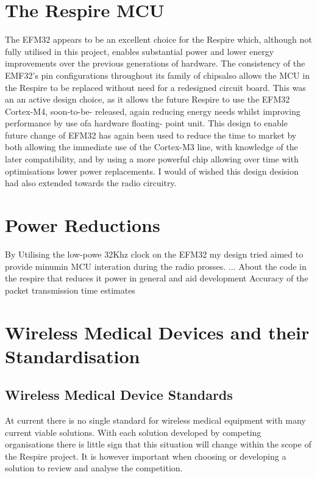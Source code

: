 \section{The Respire MCU}
The EFM32 appears to be an excellent choice for the Respire which, although not fully utilised in this
project, enables substantial power and lower energy improvements over the previous generations of
hardware. The consistency of the EMF32's pin configurations throughout its family of chipsalso
allows the MCU in the Respire to be replaced without need for a redesigned circuit board. This was
an an active design choice, as it allows the future Respire to use the EFM32 Cortex-M4, soon-to-be-
released, again reducing energy needs whilst improving performance by use ofa hardware floating-
point unit. This design to enable future change of EFM32 has again been used to reduce the time to
market by both allowing the immediate use of the Cortex-M3 line, with knowledge of the later
compatibility, and by using a more powerful chip allowing over time with optimisations lower power
replacements. I would of wished this design desision had also extended towards the radio circuitry.

\section{Power Reductions}
By Utilising the low-powe 32Khz clock on the EFM32 my design tried aimed to provide minumin MCU
interation during the radio prosses. ...
About the code in the respire that reduces it power in general and aid development
Accuracy of the packet transmission time estimates

\section{Wireless Medical Devices and their Standardisation}

\subsection{Wireless Medical Device Standards}
At current there is no single standard for wireless medical equipment with many current viable
solutions. With each solution developed by competing organisations there is little sign that this
situation will change within the scope of the Respire project. It is however important when choosing
or developing a solution to review and analyse the competition.

